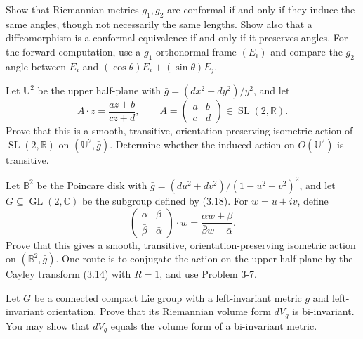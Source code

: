 \begin{exercise}
\label{prob:conformal-metrics}
Show that Riemannian metrics $g_1,g_2$ are conformal if and only if they induce
the same angles, though not necessarily the same lengths. Show also that a
diffeomorphism is a conformal equivalence if and only if it preserves angles.
For the forward computation, use a $g_1$-orthonormal frame $(E_i)$ and compare
the $g_2$-angle between $E_i$ and
$(\cos\theta)E_i+(\sin\theta)E_j$.
\end{exercise}

\begin{exercise}
\label{prob:sl2r-upper-half-plane}
Let $\mathbb U^2$ be the upper half-plane with
$\bar g=(dx^2+dy^2)/y^2$, and let
\[
A\cdot z=\frac{az+b}{cz+d},
\qquad
A=\begin{pmatrix}a&b\\c&d\end{pmatrix}\in\operatorname{SL}(2,\mathbb R).
\]
Prove that this is a smooth, transitive, orientation-preserving isometric action
of $\operatorname{SL}(2,\mathbb R)$ on $(\mathbb U^2,\bar g)$. Determine whether
the induced action on $O(\mathbb U^2)$ is transitive.
\end{exercise}

\begin{exercise}
\label{prob:poincare-disk}
Let $\mathbb B^2$ be the Poincare disk with
$\bar g=(du^2+dv^2)/(1-u^2-v^2)^2$, and let $G\subseteq\operatorname{GL}(2,\mathbb C)$
be the subgroup defined by (3.18). For $w=u+iv$, define
\[
\begin{pmatrix}\alpha&\beta\\\bar\beta&\bar\alpha\end{pmatrix}\cdot w
=\frac{\alpha w+\beta}{\bar\beta w+\bar\alpha}.
\]
Prove that this gives a smooth, transitive, orientation-preserving isometric
action on $(\mathbb B^2,\bar g)$. One route is to conjugate the action on the
upper half-plane by the Cayley transform (3.14) with $R=1$, and use Problem 3-7.
\end{exercise}

\begin{exercise}
\label{prob:compact-lie-group-volume-form-bi-invariant}
Let $G$ be a connected compact Lie group with a left-invariant metric $g$ and
left-invariant orientation. Prove that its Riemannian volume form $dV_g$ is bi-invariant. You may
show that $dV_g$ equals the volume form of a bi-invariant metric.
\end{exercise}


